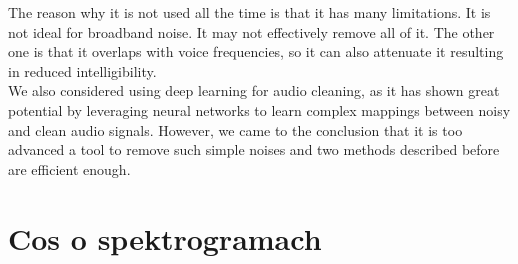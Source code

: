 \documentclass[11pt, letterpaper]{article}
\begin{document}
The reason why it is not used all the time is that it has many limitations. It is not ideal for broadband noise. It may not effectively remove all of it. The other one is that it overlaps with voice frequencies, so it can also attenuate it resulting in reduced intelligibility.\\We also considered using deep learning for audio cleaning, as it has shown great potential by leveraging neural networks to learn complex mappings between noisy and clean audio signals. However, we came to the conclusion that it is too advanced a tool to remove such simple noises and two methods described before are efficient enough.\section{Cos o spektrogramach}
\end{document}
